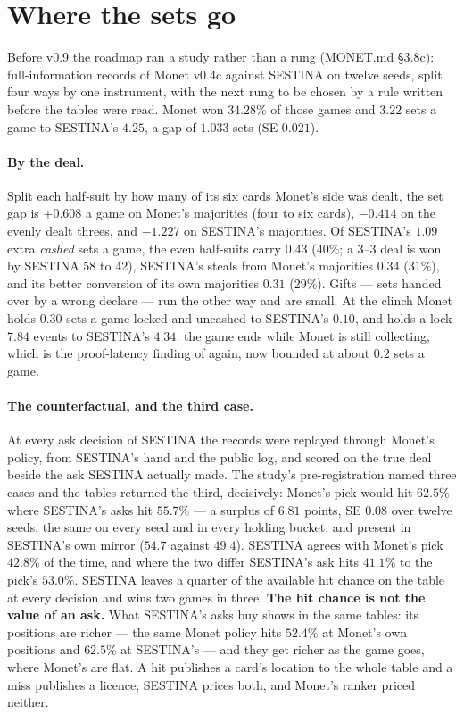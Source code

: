 \documentclass[11pt]{article}
\newcommand{\monet}{MONET.md}
\begin{document}
\section{Where the sets go}
\label{sec:sets}

Before v0.9 the roadmap ran a study rather than a rung (\monet{} \S3.8c): full-information records of
Monet v0.4c against SESTINA on twelve seeds, split four ways by one instrument, with the next rung
to be chosen by a rule written before the tables were read. Monet won $34.28\%$ of those games and
$3.22$ sets a game to SESTINA's $4.25$, a gap of $1.033$ sets (SE $0.021$).

\paragraph{By the deal.} Split each half-suit by how many of its six cards Monet's side was dealt,
the set gap is $+0.608$ a game on Monet's majorities (four to six cards), $-0.414$ on the evenly
dealt threes, and $-1.227$ on SESTINA's majorities. Of SESTINA's $1.09$ extra \emph{cashed} sets a
game, the even half-suits carry $0.43$ ($40\%$; a $3$--$3$ deal is won by SESTINA 58 to 42),
SESTINA's steals from Monet's majorities $0.34$ ($31\%$), and its better conversion of its own
majorities $0.31$ ($29\%$). Gifts --- sets handed over by a wrong declare --- run the other way and
are small. At the clinch Monet holds $0.30$ sets a game locked and uncashed to SESTINA's $0.10$, and
holds a lock $7.84$ events to SESTINA's $4.34$: the game ends while Monet is still collecting, which
is the proof-latency finding of \cite{frontier} again, now bounded at about $0.2$ sets a game.

\paragraph{The counterfactual, and the third case.} At every ask decision of SESTINA the records
were replayed through Monet's policy, from SESTINA's hand and the public log, and scored on the true
deal beside the ask SESTINA actually made. The study's pre-registration named three cases and the
tables returned the third, decisively: Monet's pick would hit $62.5\%$ where SESTINA's asks hit
$55.7\%$ --- a surplus of $6.81$ points, SE $0.08$ over twelve seeds, the same on every seed and in
every holding bucket, and present in SESTINA's own mirror ($54.7$ against $49.4$). SESTINA agrees
with Monet's pick $42.8\%$ of the time, and where the two differ SESTINA's ask hits $41.1\%$ to the
pick's $53.0\%$. SESTINA leaves a quarter of the available hit chance on the table at every decision
and wins two games in three. \textbf{The hit chance is not the value of an ask.} What SESTINA's asks
buy shows in the same tables: its positions are richer --- the same Monet policy hits $52.4\%$ at
Monet's own positions and $62.5\%$ at SESTINA's --- and they get richer as the game goes, where
Monet's are flat. A hit publishes a card's location to the whole table and a miss publishes a
licence; SESTINA prices both, and Monet's ranker priced neither.
\end{document}
